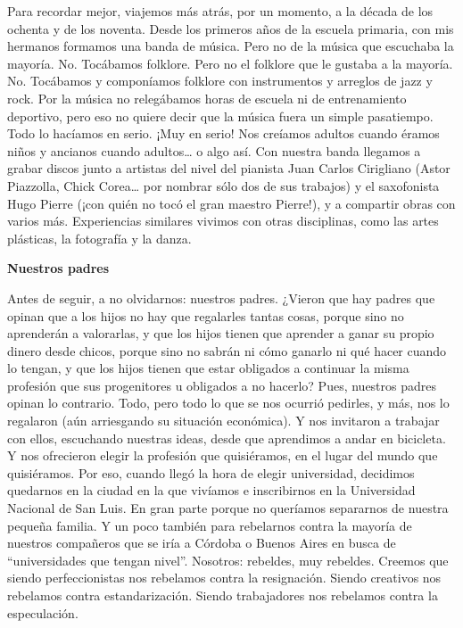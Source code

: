 Para recordar mejor, viajemos más atrás, por un momento, a la década de
los ochenta y de los noventa. Desde los primeros años de la escuela
primaria, con mis hermanos formamos una banda de música. Pero no de la
música que escuchaba la mayoría. No. Tocábamos folklore. Pero no el
folklore que le gustaba a la mayoría. No. Tocábamos y componíamos
folklore con instrumentos y arreglos de jazz y rock. Por la música no
relegábamos horas de escuela ni de entrenamiento deportivo, pero eso no
quiere decir que la música fuera un simple pasatiempo. Todo lo hacíamos
en serio. ¡Muy en serio! Nos creíamos adultos cuando éramos niños y
ancianos cuando adultos\ldots{} o algo así. Con nuestra banda llegamos a
grabar discos junto a artistas del nivel del pianista Juan Carlos
Cirigliano (Astor Piazzolla, Chick Corea\ldots{} por nombrar sólo dos de
sus trabajos) y el saxofonista Hugo Pierre (¡con quién no tocó el gran
maestro Pierre!), y a compartir obras con varios más. Experiencias
similares vivimos con otras disciplinas, como las artes plásticas, la
fotografía y la danza.

\textbf{Nuestros padres}

Antes de seguir, a no olvidarnos: nuestros padres. ¿Vieron que hay
padres que opinan que a los hijos no hay que regalarles tantas cosas,
porque sino no aprenderán a valorarlas, y que los hijos tienen que
aprender a ganar su propio dinero desde chicos, porque sino no sabrán ni
cómo ganarlo ni qué hacer cuando lo tengan, y que los hijos tienen que
estar obligados a continuar la misma profesión que sus progenitores u
obligados a no hacerlo? Pues, nuestros padres opinan lo contrario. Todo,
pero todo lo que se nos ocurrió pedirles, y más, nos lo regalaron (aún
arriesgando su situación económica). Y nos invitaron a trabajar con
ellos, escuchando nuestras ideas, desde que aprendimos a andar en
bicicleta. Y nos ofrecieron elegir la profesión que quisiéramos, en el
lugar del mundo que quisiéramos. Por eso, cuando llegó la hora de elegir
universidad, decidimos quedarnos en la ciudad en la que vivíamos e
inscribirnos en la Universidad Nacional de San Luis. En gran parte
porque no queríamos separarnos de nuestra pequeña familia. Y un poco
también para rebelarnos contra la mayoría de nuestros compañeros que se
iría a Córdoba o Buenos Aires en busca de ``universidades que tengan
nivel''. Nosotros: rebeldes, muy rebeldes. Creemos que siendo
perfeccionistas nos rebelamos contra la resignación. Siendo creativos
nos rebelamos contra estandarización. Siendo trabajadores nos rebelamos
contra la especulación.

